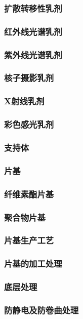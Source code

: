 \documentclass[UTF8]{../../ApplicationUniverse}
\begin{document}
        \subsubsection{扩散转移性乳剂}
        \subsubsection{红外线光谱乳剂}
        \subsubsection{紫外线光谱乳剂}
        \subsubsection{核子摄影乳剂}
        \subsubsection{X射线乳剂}
    \subsubsection{彩色感光乳剂}
\subsubsection{支持体}
    \subsubsection{片基}
        \subsubsection{纤维素酯片基}
        \subsubsection{聚合物片基}
        \subsubsection{片基生产工艺}
        \subsubsection{片基的加工处理}
            \subsubsection{底层处理}
            \subsubsection{防静电及防卷曲处理}
\end{document}
